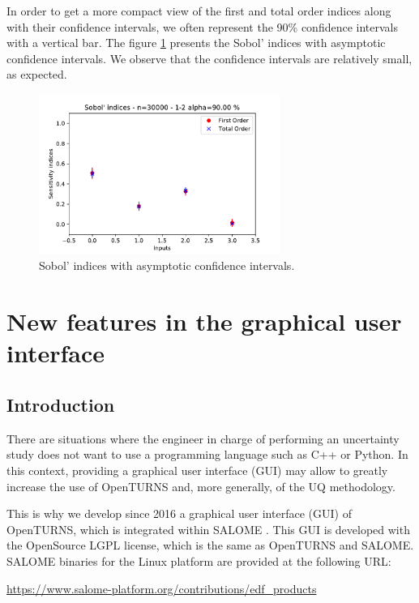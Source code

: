 \documentclass{uncecomp2019}
\begin{document}
In order to get a more compact view of the first and total order indices 
along with their confidence intervals, we often represent the 90\% confidence 
intervals with a vertical bar. 
The figure \ref{fig:sobolindices} presents the Sobol' indices with 
asymptotic confidence intervals. 
We observe that the confidence intervals are relatively small, 
as expected. 

\begin{figure}
\begin{center}
    \includegraphics[width=0.7\textwidth]{figures/crue-Sobol-indices} 
\end{center}
\caption{Sobol' indices with asymptotic confidence intervals.}
\label{fig:sobolindices}
\end{figure}


\section{New features in the graphical user interface}

\subsection{Introduction}

There are situations where the engineer in charge of performing an uncertainty study does not want to use
a programming language such as C++ or Python. 
In this context, providing a graphical user interface (GUI) may allow to greatly increase the use of
OpenTURNS and, more generally, of the UQ methodology. 

This is why we develop since 2016 a graphical user interface (GUI) of OpenTURNS, which is integrated within 
SALOME \cite{SALOMEurl}. 
This GUI is developed with the OpenSource LGPL license, which is the same as OpenTURNS and SALOME. 
SALOME binaries for the Linux platform are provided at the following URL:
\begin{center}
\url{https://www.salome-platform.org/contributions/edf_products}
\end{center}
\end{document}
